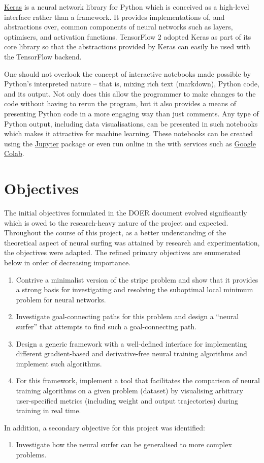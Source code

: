 \href{https://keras.io/}{Keras} is a neural network library for Python which is conceived as a high-level interface rather than a framework. 
It provides implementations of, and abstractions over, common components of neural networks such as layers, optimisers, and activation functions.
TensorFlow 2 adopted Keras as part of its core library so that the abstractions provided by Keras can easily be used with the TensorFlow backend.

One should not overlook the concept of interactive notebooks made possible by Python's interpreted nature -- that is, mixing rich text (markdown), Python code, and its output. 
Not only does this allow the programmer to make changes to the code without having to rerun the program, but it also provides a means of presenting Python code in a more engaging way than just comments.
Any type of Python output, including data visualisations, can be presented in such notebooks which makes it attractive for machine learning.
These notebooks can be created using the \href{https://jupyter.org/}{Jupyter} package or even run online in the with services such as \href{https://colab.research.google.com/}{Google Colab}. 

\section{Objectives}
The initial objectives formulated in the DOER document evolved significantly which is owed to the research-heavy nature of the project and expected.
Throughout the course of this project, as a better understanding of the theoretical aspect of neural surfing was attained by research and experimentation, the objectives were adapted.
The refined primary objectives are enumerated below in order of decreasing importance.
\begin{enumerate}
    \item Contrive a minimalist version of the stripe problem and show that it provides a strong basis for investigating and resolving the suboptimal local minimum problem for neural networks.
    \item Investigate goal-connecting paths for this problem and design a “neural surfer” that attempts to find such a goal-connecting path.
    \item Design a generic framework with a well-defined interface for implementing different gradient-based and derivative-free neural training algorithms and implement such algorithms.
    \item For this framework, implement a tool that facilitates the comparison of neural training algorithms on a given problem (dataset) by visualising arbitrary user-specified metrics (including weight and output trajectories) during training in real time.
\end{enumerate}
In addition, a secondary objective for this project was identified:
\begin{enumerate}
    \item Investigate how the neural surfer can be generalised to more complex problems.
\end{enumerate}

